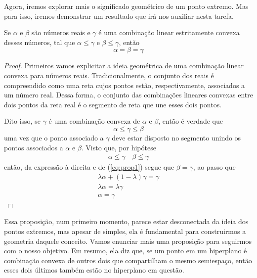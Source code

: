 Agora, iremos explorar mais o significado geométrico de um ponto extremo.
Mas para isso, iremos demonstrar um resultado que irá nos auxiliar nesta tarefa.

\begin{prop:combinação convexa}
	\label{prop:combinação convexa}
	Se $\alpha$ e $\beta$ são números reais e $\gamma$ é uma combinação linear
	estritamente convexa desses números, tal que $\alpha \leq \gamma$ e
	$\beta \leq \gamma$, então \[\alpha = \beta = \gamma\]

	\begin{proof}
		Primeiros vamos explicitar a ideia geométrica de uma combinação linear
		convexa para números reais. Tradicionalmente, o conjunto dos reais é
		compreendido como uma reta cujos pontos estão, respectivamente, associados
		a um número real. Dessa forma, o conjunto das combinações lineares convexas
		entre dois pontos da reta real é o segmento de reta que une esses dois pontos.

		Dito isso, se $\gamma$ é uma combinação convexa de $\alpha$ e $\beta$, então é verdade que
		\begin{equation}
			\label{eq:prop1}
			\alpha \leq \gamma \leq \beta
		\end{equation}uma vez que o ponto associado a $\gamma$ deve estar
		disposto no segmento unindo os pontos associados a $\alpha$ e $\beta$.
		Visto que, por hipótese
		\begin{align*}
			\alpha \leq \gamma \quad \beta \leq \gamma
		\end{align*}
		então, da expressão à direita e de (\ref{eq:prop1})
		segue que $\beta = \gamma$, ao passo que
		\begin{gather*}
			\lambda \alpha + (1 - \lambda) \gamma = \gamma \\
			\lambda \alpha = \lambda \gamma \\
			\alpha = \gamma
		\end{gather*}
	\end{proof}
\end{prop:combinação convexa}

Essa proposição, num primeiro momento, parece estar desconectada da ideia dos
pontos extremos, mas apesar de simples, ela é fundamental para construirmos
a geometria daquele conceito. Vamos enunciar mais uma proposição para
seguirmos com o nosso objetivo. Em resumo, ela diz que, se um ponto em um
hiperplano é combinação convexa de outros dois que compartilham o mesmo
semiespaço, então esses dois últimos também estão no hiperplano em questão.

